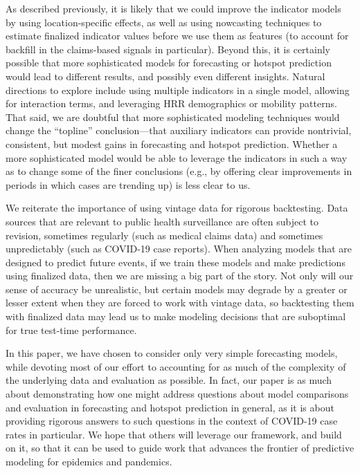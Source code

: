 \documentclass[9pt,twocolumn,twoside,lineno]{pnas-new}
\begin{document}
As described previously, it is likely that we could improve the indicator models
by using location-specific effects, as well as using nowcasting techniques to
estimate finalized indicator values before we use them as features (to account
for backfill in the claims-based signals in particular).  Beyond this, it is
certainly possible that more sophisticated models for forecasting or hotspot
prediction would lead to different results, and possibly even different
insights. Natural directions to explore include using multiple indicators in a
single model, allowing for interaction terms, and leveraging HRR demographics or
mobility patterns.  That said, we are doubtful that more sophisticated modeling
techniques would change the ``topline'' conclusion---that auxiliary indicators
can provide nontrivial, consistent, but modest gains in forecasting and hotspot
prediction. Whether a more sophisticated model would be able to leverage the
indicators in such a way as to change some of the finer conclusions (e.g., by 
offering clear improvements in periods in which cases are trending up) is less 
clear to us.

We reiterate the importance of using vintage data for rigorous backtesting. Data
sources that are relevant to public health surveillance are often subject to
revision, sometimes regularly (such as medical claims data) and sometimes
unpredictably (such as COVID-19 case reports).  When analyzing models that are
designed to predict future events, if we train these models and make predictions
using finalized data, then we are missing a big part of the story.  Not only
will our sense of accuracy be unrealistic, but certain models may degrade by a
greater or lesser extent when they are forced to work with vintage data, so 
backtesting them with finalized data may lead us to make modeling decisions that
are suboptimal for true test-time performance.    

In this paper, we have chosen to consider only very simple forecasting models,
while devoting most of our effort to accounting for as much of the complexity of
the underlying data and evaluation as possible.  In fact, our paper is as much
about demonstrating how one might address questions about model comparisons and
evaluation in forecasting and hotspot prediction in general, as it is about
providing rigorous answers to such questions in the context of COVID-19 case
rates in particular.  We hope that others will leverage our framework, and build
on it, so that it can be used to guide work that advances the frontier of
predictive modeling for epidemics and pandemics.
\end{document}
